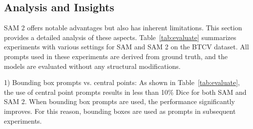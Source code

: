 \begin{table*}[t]
   \vspace{-0.6cm}
    \centering
    \caption{Performance evaluation of SAM and SAM 2 with different prompt settings on the BTCV dataset.}
    \label{tab:evaluate}
   \vspace{-0.2cm}
\end{table*}






\subsection{Analysis and Insights}
SAM 2 offers notable advantages but also has inherent limitations. This section provides a detailed analysis of these aspects. Table~\ref{tab:evaluate} summarizes experiments with various settings for SAM and SAM 2 on the BTCV dataset. All prompts used in these experiments are derived from ground truth, and the models are evaluated without any structural modifications.

1) Bounding box prompts vs. central points: As shown in Table~\ref{tab:evaluate}, the use of central point prompts results in less than 10\% Dice for both SAM and SAM 2. When bounding box prompts are used, the performance significantly improves. For this reason, bounding boxes are used as prompts in subsequent experiments.

